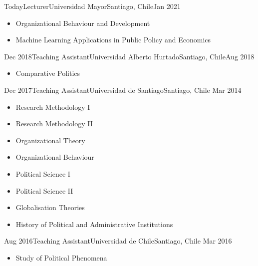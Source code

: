 





\begin{experiences}
  \experience
    {Today}{Lecturer}{Universidad Mayor}{Santiago, Chile}{Jan 2021}
    {\begin{itemize}
    \item Organizational Behaviour and Development
    \item Machine Learning Applications in Public Policy and Economics
    \end{itemize}}
    {}
\end{experiences}
\vspace{-2mm}

\begin{experiences}
  \experience
    {Dec 2018}{Teaching Assistant}{Universidad Alberto Hurtado}{Santiago, Chile}{Aug 2018}
    {\begin{itemize}
    \item Comparative Politics
    \end{itemize}}
    {}
\end{experiences}
\vspace{-2mm}

\begin{experiences}
  \emptySeparator 
  \experience 
    {Dec 2017}{Teaching Assistant}{Universidad de Santiago}{Santiago, Chile} {Mar 2014}
    {\begin{itemize}
    \item Research Methodology I
    \item Research Methodology II
    \item Organizational Theory
    \item Organizational Behaviour
    \item Political Science I
    \item Political Science II
	\item Globalisation Theories
	\item History of Political and Administrative Institutions
    \end{itemize}}
    {}
\end{experiences}
\vspace{-2mm}

\begin{experiences}
  \emptySeparator 
  \experience 
    {Aug 2016}{Teaching Assistant}{Universidad de Chile}{Santiago, Chile} {Mar 2016}
    {\begin{itemize}
    \item Study of Political Phenomena
    \end{itemize}}
    {}
\end{experiences}
